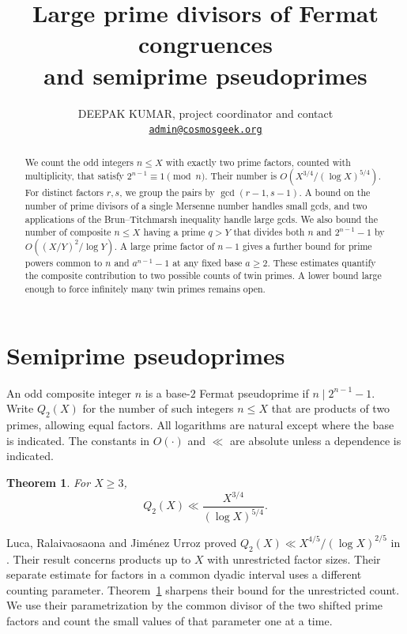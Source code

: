 \documentclass[11pt]{article}
\title{Large prime divisors of Fermat congruences\\and semiprime pseudoprimes}
\author{\byline}
\date{\small DEEPAK KUMAR, project coordinator and contact\\[2pt]
  \href{mailto:admin@cosmosgeek.org}{\nolinkurl{admin@cosmosgeek.org}}}
\newtheorem{theorem}{Theorem}[section]
\begin{document}
\maketitle
\begin{abstract}
We count the odd integers \(n\le X\) with exactly two prime factors,
counted with multiplicity, that satisfy \(2^{n-1}\equiv1\pmod n\).
Their number is \(O(X^{3/4}/(\log X)^{5/4})\). For distinct
factors \(r,s\), we group the pairs by \(\gcd(r-1,s-1)\).
A bound on the number of prime divisors of a single Mersenne number
handles small gcds, and two applications of the Brun--Titchmarsh
inequality handle large gcds. We also bound the number of composite
\(n\le X\) having a prime \(q>Y\) that divides both \(n\) and
\(2^{n-1}-1\) by \(O((X/Y)^2/\log Y)\). A large prime factor
of \(n-1\) gives a further bound for prime powers common to
\(n\) and \(a^{n-1}-1\) at any fixed base \(a\ge2\). These estimates quantify
the composite contribution to two possible counts of twin primes.
A lower bound large enough to force infinitely many twin primes remains open.
\end{abstract}

\section{Semiprime pseudoprimes}

An odd composite integer \(n\) is a base-\(2\) Fermat pseudoprime if
\(n\mid 2^{n-1}-1\). Write \(Q_2(X)\) for the number of such integers
\(n\le X\) that are products of two primes, allowing equal factors.
All logarithms are natural except where the base is indicated. The
constants in \(O(\cdot)\) and \(\ll\) are absolute unless a
dependence is indicated.

\begin{theorem}\label{thm:semiprime}
For \(X\ge3\),
\[
             Q_2(X)\ll \frac{X^{3/4}}{(\log X)^{5/4}}.
\]
\end{theorem}

Luca, Ralaivaosaona and Jim\'enez Urroz proved
\(Q_2(X)\ll X^{4/5}/(\log X)^{2/5}\) in
\cite[Theorem~3.1]{LRJ}. Their result concerns products up to \(X\)
with unrestricted factor sizes. Their separate estimate for factors
in a common dyadic interval uses a different counting parameter.
Theorem~\ref{thm:semiprime} sharpens their bound for the unrestricted
count. We use their parametrization by the common divisor of the two
shifted prime factors and count the small values of that parameter
one at a time.
\end{document}
